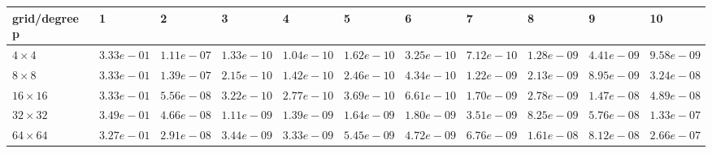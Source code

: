 \begin{tabular}{lllllllllll}
\hline
 grid/degree p   & 1          & 2          & 3          & 4          & 5          & 6          & 7          & 8          & 9          & 10         \\
\hline
 $4 \times 4$    & $3.33e-01$ & $1.11e-07$ & $1.33e-10$ & $1.04e-10$ & $1.62e-10$ & $3.25e-10$ & $7.12e-10$ & $1.28e-09$ & $4.41e-09$ & $9.58e-09$ \\
 $8 \times 8$    & $3.33e-01$ & $1.39e-07$ & $2.15e-10$ & $1.42e-10$ & $2.46e-10$ & $4.34e-10$ & $1.22e-09$ & $2.13e-09$ & $8.95e-09$ & $3.24e-08$ \\
 $16 \times 16$  & $3.33e-01$ & $5.56e-08$ & $3.22e-10$ & $2.77e-10$ & $3.69e-10$ & $6.61e-10$ & $1.70e-09$ & $2.78e-09$ & $1.47e-08$ & $4.89e-08$ \\
 $32 \times 32$  & $3.49e-01$ & $4.66e-08$ & $1.11e-09$ & $1.39e-09$ & $1.64e-09$ & $1.80e-09$ & $3.51e-09$ & $8.25e-09$ & $5.76e-08$ & $1.33e-07$ \\
 $64 \times 64$  & $3.27e-01$ & $2.91e-08$ & $3.44e-09$ & $3.33e-09$ & $5.45e-09$ & $4.72e-09$ & $6.76e-09$ & $1.61e-08$ & $8.12e-08$ & $2.66e-07$ \\
\hline
\end{tabular}